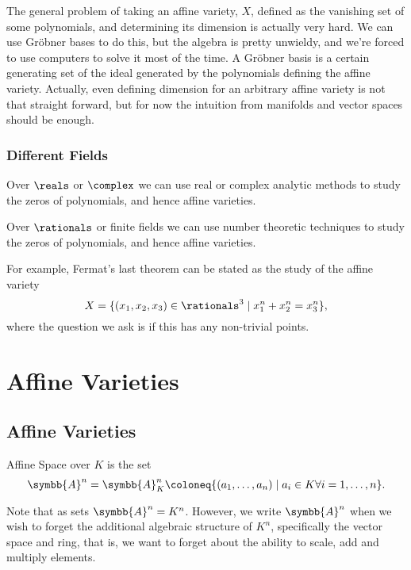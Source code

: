 \documentclass[fleqn]{NotesClass}
\newcommand{\affine}{\symbb{A}}
\begin{document}
    The general problem of taking an affine variety, \(X\), defined as the vanishing set of some polynomials, and determining its dimension is actually very hard.
    We can use Gr\"obner bases to do this, but the algebra is pretty unwieldy, and we're forced to use computers to solve it most of the time.
    A Gr\"obner basis is a certain generating set of the ideal generated by the polynomials defining the affine variety.
    Actually, even defining dimension for an arbitrary affine variety is not that straight forward, but for now the intuition from manifolds and vector spaces should be enough.
    
    \subsection{Different Fields}
    Over \(\reals\) or \(\complex\) we can use real or complex analytic methods to study the zeros of polynomials, and hence affine varieties.
    
    Over \(\rationals\) or finite fields we can use number theoretic techniques to study the zeros of polynomials, and hence affine varieties.
    
    For example, Fermat's last theorem can be stated as the study of the affine variety
    \begin{equation}
        X = \{(x_1, x_2, x_3) \in \rationals^3 \mid x_1^n + x_2^n = x_3^n\},
    \end{equation}
    where the question we ask is if this has any non-trivial points.
    
    \chapter{Affine Varieties}
    \section{Affine Varieties}
    \begin{dfn}{Affine Space}{}
         over \(K\) is the set
        \begin{equation}
            \affine^n = \affine_K^n \coloneq \{(a_1, \dotsc, a_n) \mid a_i \in K \forall i = 1, \dotsc, n\}.
        \end{equation}
    \end{dfn}
    
    Note that as sets \(\affine^n = K^n\).
    However, we write \(\affine^n\) when we wish to forget the additional algebraic structure of \(K^n\), specifically the vector space and ring, that is, we want to forget about the ability to scale, add and multiply elements.
    
\end{document}

